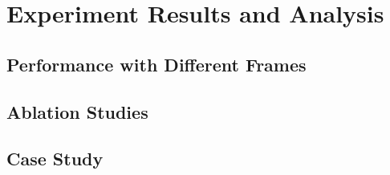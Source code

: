\clearpage
\section{Experiment Results and Analysis}
\subsection{Performance with Different Frames}\label{app:frame}


\clearpage
\subsection{Ablation Studies}\label{app:ablation}



\clearpage
\subsection{Case Study}\label{app:case}



